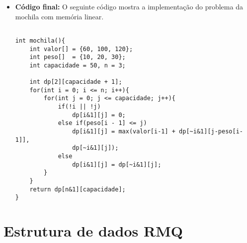 \begin{itemize}
\item \textbf{Código final:} 
O seguinte código mostra a implementação do problema da mochila com memória linear.
\begin{lstlisting}[caption={Implementação Mochila},label={lst:lis}]

int mochila(){
	int valor[] = {60, 100, 120};
	int peso[]  = {10, 20, 30};
	int capacidade = 50, n = 3;

	int dp[2][capacidade + 1];
	for(int i = 0; i <= n; i++){
		for(int j = 0; j <= capacidade; j++){
			if(!i || !j)
				dp[i&1][j] = 0;
			else if(peso[i - 1] <= j)
				dp[i&1][j] = max(valor[i-1] + dp[~i&1][j-peso[i-1]],
				dp[~i&1][j]);
			else
				dp[i&1][j] = dp[~i&1][j];
		}
	}
	return dp[n&1][capacidade]; 
}
\end{lstlisting}
\end{itemize}


\section{Estrutura de dados RMQ}

